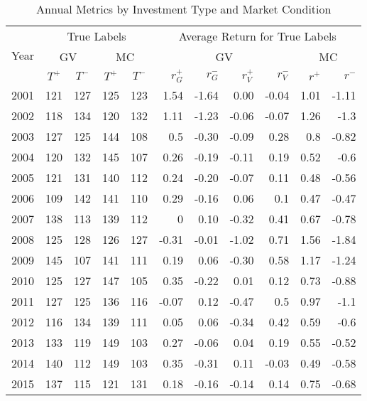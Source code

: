 \documentclass{article}
\begin{document}
\begin{table}[!ht]
    \centering
    \caption{Annual Metrics by Investment Type and Market Condition}
    \begin{tabular}{l| cc | cc || rrrr|rr}
    \hline
    \multirow{3}{*}{Year} & \multicolumn{4}{c||}{True Labels}   & \multicolumn{6}{c}{Average Return for True Labels}  \\ \cline{2-11}
     & \multicolumn{2}{c|}{GV}  &  \multicolumn{2}{c||}{MC}  & \multicolumn{4}{c|}{GV}  &  \multicolumn{2}{c}{MC}  \\ \cline{2-11}
    & $T^{+}$ & $T^{-}$ & $T^{+}$ & $T^{-}$ & $r^{+}_{G}$ & $r^{-}_{G}$ & $r^{+}_{V}$ & $r^{-}_{V}$ & $r^{+}$ & $r^{-}$ \\ \cline{1-11}
        2001 & 121 & 127 & 125 & 123 & 1.54 & -1.64 & 0.00 & -0.04 & 1.01 & -1.11 \\ 
        2002 & 118 & 134 & 120 & 132 & 1.11 & -1.23 & -0.06 & -0.07 & 1.26 & -1.3 \\ 
        2003 & 127 & 125 & 144 & 108 & 0.5 & -0.30 & -0.09 & 0.28 & 0.8 & -0.82 \\ 
        2004 & 120 & 132 & 145 & 107 & 0.26 & -0.19 & -0.11 & 0.19 & 0.52 & -0.6 \\ 
        2005 & 121 & 131 & 140 & 112 & 0.24 & -0.20 & -0.07 & 0.11 & 0.48 & -0.56 \\ 
        2006 & 109 & 142 & 141 & 110 & 0.29 & -0.16 & 0.06 & 0.1 & 0.47 & -0.47 \\ 
        2007 & 138 & 113 & 139 & 112 & 0 & 0.10 & -0.32 & 0.41 & 0.67 & -0.78 \\ 
        2008 & 125 & 128 & 126 & 127 & -0.31 & -0.01 & -1.02 & 0.71 & 1.56 & -1.84 \\ 
        2009 & 145 & 107 & 141 & 111 & 0.19 & 0.06 & -0.30 & 0.58 & 1.17 & -1.24 \\ 
        2010 & 125 & 127 & 147 & 105 & 0.35 & -0.22 & 0.01 & 0.12 & 0.73 & -0.88 \\ 
        2011 & 127 & 125 & 136 & 116 & -0.07 & 0.12 & -0.47 & 0.5 & 0.97 & -1.1 \\ 
        2012 & 116 & 134 & 139 & 111 & 0.05 & 0.06 & -0.34 & 0.42 & 0.59 & -0.6 \\ 
        2013 & 133 & 119 & 149 & 103 & 0.27 & -0.06 & 0.04 & 0.19 & 0.55 & -0.52 \\ 
        2014 & 140 & 112 & 149 & 103 & 0.35 & -0.31 & 0.11 & -0.03 & 0.49 & -0.58 \\ 
        2015 & 137 & 115 & 121 & 131 & 0.18 & -0.16 & -0.14 & 0.14 & 0.75 & -0.68 \\ 

\end{tabular}
\end{table}
\end{document}
